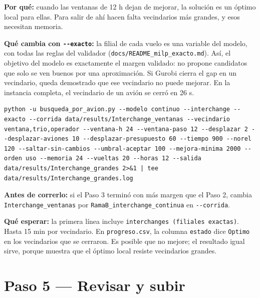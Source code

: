 \documentclass[11pt,a4paper]{article}
\newcommand{\campo}[1]{\par\smallskip\textbf{\color{acento}#1}\quad}
\begin{document}
\campo{Por qué:} cuando las ventanas de 12 h dejan de mejorar, la solución es un óptimo local para ellas. Para salir de ahí hacen falta vecindarios más grandes, y esos necesitan memoria.

\campo{Qué cambia con \texttt{-{}-exacto}:} la filial de cada vuelo es una variable del modelo, con todas las reglas del validador (\texttt{docs/README\_milp\_exacto.md}). Así, el objetivo del modelo es exactamente el margen validado: no propone candidatos que solo se ven buenos por una aproximación. Si Gurobi cierra el gap en un vecindario, queda demostrado que ese vecindario no puede mejorar. En la instancia completa, el vecindario de un avión se cerró en 26 s.

\begin{lstlisting}
python -u busqueda_por_avion.py --modelo continuo --interchange --exacto --corrida data/results/Interchange_ventanas --vecindario ventana,trio,operador --ventana-h 24 --ventana-paso 12 --desplazar 2 --desplazar-aviones 10 --desplazar-presupuesto 60 --tiempo 900 --norel 120 --saltar-sin-cambios --umbral-aceptar 100 --mejora-minima 2000 --orden uso --memoria 24 --vueltas 20 --horas 12 --salida data/results/Interchange_grandes 2>&1 | tee data/results/Interchange_grandes.log
\end{lstlisting}

\campo{Antes de correrlo:} si el Paso 3 terminó con más margen que el Paso 2, cambia \texttt{Interchange\_ventanas} por \texttt{RamaB\_interchange\_continua} en \texttt{-{}-corrida}.

\campo{Qué esperar:} la primera línea incluye \texttt{interchanges (filiales exactas)}. Hasta 15 min por vecindario. En \texttt{progreso.csv}, la columna \texttt{estado} dice \texttt{Optimo} en los vecindarios que se cerraron. Es posible que no mejore; el resultado igual sirve, porque muestra que el óptimo local resiste vecindarios grandes.

\section{Paso 5 --- Revisar y subir}
\end{document}
